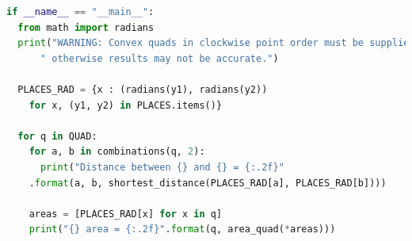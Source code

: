 \documentclass[a4paper,10pt]{article}
\begin{document}
\begin{appendices}
\begin{lstlisting}[language=Python]
if __name__ == "__main__":
  from math import radians
  print("WARNING: Convex quads in clockwise point order must be supplied, "+
	  " otherwise results may not be accurate.")
  
  PLACES_RAD = {x : (radians(y1), radians(y2)) 
    for x, (y1, y2) in PLACES.items()}
  
  for q in QUAD:
    for a, b in combinations(q, 2):
      print("Distance between {} and {} = {:.2f}"
	.format(a, b, shortest_distance(PLACES_RAD[a], PLACES_RAD[b])))
  
    areas = [PLACES_RAD[x] for x in q]
    print("{} area = {:.2f}".format(q, area_quad(*areas)))
  \end{lstlisting}


\end{appendices}
\end{document}
